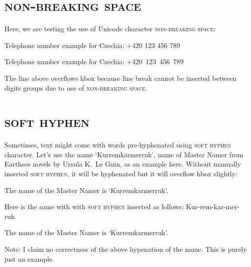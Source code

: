 \documentclass{article}
\DeclareRobustCommand{\expl}[1]{{\sffamily #1}}
\newcommand{\nbsp}{\textsc{non-breaking space}}
\newcommand{\shy}{\textsc{soft hyphen}}
\begin{document}
\pagebreak

\section{\nbsp{}}

\expl{Here, we are testing the use of Unicode character \nbsp{}:}

Telephone number example for Czechia: +420 123 456 789

Telephone number example for Czechia: +420 123 456 789

\expl{The line above overflows hbox because line break cannot be inserted
  between digits groups due to use of \nbsp{}.}

\pagebreak

\section{\shy{}}
\expl{Sometimes, text might come with words pre-​hyphenated using \shy{}
  character. Let's use the name `Kurremkarmerruk', name of Master Namer from
  Earthsee novels by Ursula K.\ Le Guin, as an example here. Without manually
  inserted \shy{}, it will be hyphenated but it will overflow hbox slightly:}

The name of the Master Namer is `Kurremkarmerruk'.

\expl{Here is the same with with \shy{} inserted as follows:
  Kur-rem-kar-mer-ruk.}

The name of the Master Namer is `Kur­rem­kar­mer­ruk'.

\expl{Note: I claim no correctness of the above hypenation of the name. This
  is purely just an example.}

\pagebreak
\end{document}
